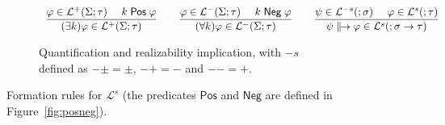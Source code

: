 \documentclass[%
  a4paper,
  UKenglish,
  cleveref,
  autoref,
  thm-restate,
  numberwithinsect,
]{lipics-v2021}
\newcommand\term[1]{\mathsf{#1}}
\newcommand\arrow\to
\newcommand\defrealto{\mathrel\parallel\joinrel\to}
\newcommand\realto{\mathrel{\defrealto}}
\newcommand\PT{\tau}		%
\newcommand\PTbis{\sigma}	%
\newcommand\itvar{k}
\newcommand\Pos{\mathrel{\term{Pos}}}
\newcommand\Neg{\mathrel{\term{Neg}}}
\newcommand\FPEnv{\Sigma}
\newcommand\Lang{\mathcal{L}}
\newcommand\sign{s}
\begin{document}
\begin{figure}[t!]
\begin{subfigure}{\textwidth}
\centering
\(
\begin{array}{c}
%
\dfrac{\varphi \in \Lang^+(\FPEnv;\PT)
  \quad~
  \itvar \Pos \varphi}
  {(\exists \itvar)\varphi \in \Lang^+(\FPEnv;\PT)}
%
\qquad
%
\dfrac{\varphi \in \Lang^-(\FPEnv;\PT)
  \quad~
  \itvar \Neg \varphi}
  {(\forall \itvar)\varphi \in \Lang^-(\FPEnv;\PT)}
%
\qquad
%
\dfrac{\psi \in \Lang^{-\sign}(;\PTbis)
  \quad~
  \varphi \in \Lang^\sign(;\PT)}
  {\psi \realto \varphi \in \Lang^\sign(;\PTbis \arrow \PT)}
%
\end{array}
\)
\caption{Quantification
and realizability implication,
with $-\sign$ defined as $-\pm = \pm$, $-+ = -$ and $-- = +$.%
\label{fig:form:pol}}
\end{subfigure}

\caption{Formation rules for $\Lang^\sign$
(the predicates $\Pos$ and $\Neg$ are defined in Figure~\ref{fig:posneg}).%
\label{fig:form}}
\end{figure}
\end{document}
